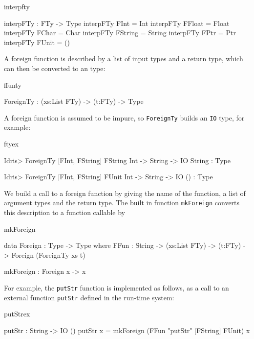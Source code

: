 \begin{SaveVerbatim}{interpfty}

interpFTy : FTy -> Type
interpFTy FInt    = Int
interpFTy FFloat  = Float
interpFTy FChar   = Char
interpFTy FString = String
interpFTy FPtr    = Ptr
interpFTy FUnit   = ()

\end{SaveVerbatim}

\noindent
A foreign function is described by a list of input types and a return type, which
can then be converted to an \Idris{} type:

\begin{SaveVerbatim}{ffunty}

ForeignTy : (xs:List FTy) -> (t:FTy) -> Type

\end{SaveVerbatim}

\noindent
A foreign function is assumed to be impure, so \texttt{ForeignTy} builds an
\texttt{IO} type, for example:

\begin{SaveVerbatim}{ftyex}

Idris> ForeignTy [FInt, FString] FString
Int -> String -> IO String : Type

Idris> ForeignTy [FInt, FString] FUnit 
Int -> String -> IO () : Type

\end{SaveVerbatim}

\noindent
We build a call to a foreign function by giving the name of the function, a list of
argument types and the return type. The built in function \texttt{mkForeign}
converts this description to a function callable by \Idris{}

\begin{SaveVerbatim}{mkForeign}

data Foreign : Type -> Type where
    FFun : String -> (xs:List FTy) -> (t:FTy) -> 
           Foreign (ForeignTy xs t)

mkForeign : Foreign x -> x

\end{SaveVerbatim}

\noindent
For example, the \texttt{putStr} function is implemented as follows, as a call to 
an external function \texttt{putStr} defined in the run-time system:

\begin{SaveVerbatim}{putStrex}

putStr : String -> IO ()
putStr x = mkForeign (FFun "putStr" [FString] FUnit) x
\end{SaveVerbatim}

